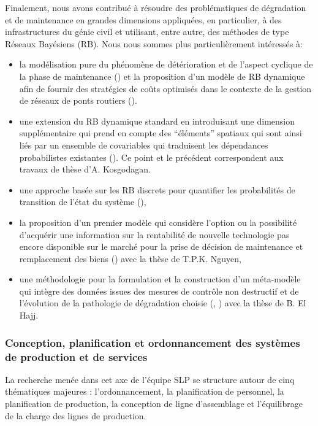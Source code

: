 Finalement, nous avons contribué à résoudre des problématiques de
dégradation et de maintenance en grandes dimensions appliquées, en
particulier, à des infrastructures du génie civil et utilisant, entre
autre, des méthodes de type Réseaux Bayésiens (RB). Nous nous sommes
plus particulièrement intéressés à:
\begin{itemize}
\item la modélisation pure du phénomène de détérioration et de
  l'aspect cyclique de la phase de maintenance
  (\cite{kosgodagan:hal-01517154}) et la proposition d'un modèle de RB
  dynamique afin de fournir des stratégies de coûts optimisés dans le
  contexte de la gestion de réseaux de ponts routiers
  (\cite{kosgodagandallatorre:hal-01517168}).
\item une extension du RB dynamique standard en introduisant une
  dimension supplémentaire qui prend en compte des ``éléments''
  spatiaux qui sont ainsi liés par un ensemble de covariables qui
  traduisent les dépendances probabilistes existantes
  (\cite{kosgodagan:hal-01517174}). Ce point et le précédent
  correspondent aux travaux de thèse d'A. Kosgodagan.
\item une approche basée sur les RB discrets pour quantifier les
  probabilités de transition de l'état du système
  (\cite{acharige:hal-01152564}),
\item la proposition d'un premier modèle qui considère l'option ou la
  possibilité d'acquérir une information sur la rentabilité de
  nouvelle technologie pas encore disponible sur le marché pour la
  prise de décision de maintenance et remplacement des biens
  (\cite{nguyen:hal-01520843}) avec la thèse de T.P.K. Nguyen,
\item une méthodologie pour la formulation et la construction d'un
  méta-modèle qui intègre des données issues des mesures de contrôle
  non destructif et de l'évolution de la pathologie de dégradation
  choisie (\cite{elhajj:hal-01520822}, \cite{elhajj:hal-01316236})
  avec la thèse de B. El Hajj.
\end{itemize}

 \subsubsection{Conception, planification et ordonnancement des systèmes de production et de services}
  
La recherche menée dans cet axe de l’équipe SLP se structure autour de cinq thématiques majeures : l’ordonnancement, la planification de personnel, la planification de production, la conception de ligne d’assemblage et l’équilibrage de la charge des lignes de production. \\

